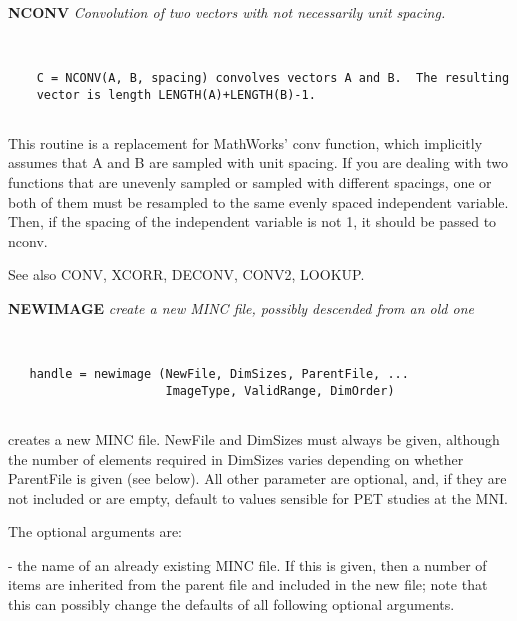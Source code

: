 {\large\bf NCONV} {\em  Convolution of two vectors with not necessarily unit spacing.}
\begin{verbatim}


 	C = NCONV(A, B, spacing) convolves vectors A and B.  The resulting
 	vector is length LENGTH(A)+LENGTH(B)-1.


\end{verbatim}

        This routine is a replacement for MathWorks' conv function, 
        which implicitly assumes that A and B are sampled with unit
        spacing.  If you are dealing with two functions that are
        unevenly sampled or sampled with different spacings, one or
 	both of them must be resampled to the same evenly spaced 
 	independent variable.  Then, if the spacing of the independent
 	variable is not 1, it should be passed to nconv.
 
 	See also CONV, XCORR, DECONV, CONV2, LOOKUP.
\endfunchelp


{\large\bf NEWIMAGE} {\em  create a new MINC file, possibly descended from an old one}
\begin{verbatim}


   handle = newimage (NewFile, DimSizes, ParentFile, ...
                      ImageType, ValidRange, DimOrder)


\end{verbatim}

  creates a new MINC file.  NewFile and DimSizes must always be given,
  although the number of elements required in DimSizes varies
  depending on whether ParentFile is given (see below).  All other
  parameter are optional, and, if they are not included or are
  empty, default to values sensible for PET studies at the MNI.
 
  The optional arguments are:
 
\begin{description}
\item {} - the name of an already existing MINC file.  If this
                 is given, then a number of items are inherited from
                 the parent file and included in the new file; note
                 that this can possibly change the defaults of all
                 following optional arguments.
\end{description}
 
